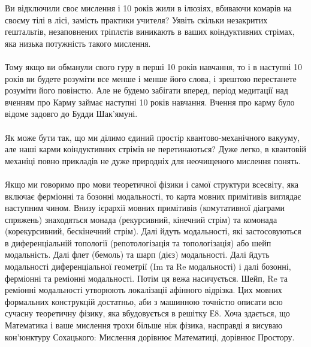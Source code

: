 \newpage
Ви відключили своє мислення і 10 років жили в ілюзіях, вбиваючи комарів на своєму тілі в лісі, замість практики учителя?
Уявіть скільки незакритих гештальтів, незаповнених тріплєтів виникають в ваших коіндуктивних стрімах, яка низька потужність такого мислення.
\\
\\
Тому якщо ви обманули свого гуру в перші 10 років навчання, то і в наступні 10 років ви будете розуміти все менше і менше його слова,
і зрештою перестанете розуміти його повінстю. Але не будемо забігати вперед, період медитації над вченням про Карму займає наступні 10
років навчання. Вчення про карму було відоме задовго до Будди Шак'ямуні.
\\
\\
Як може бути так, що ми ділимо єдиний простір квантово-механічного вакууму, але наші карми коіндуктивних стрімів не перетинаються?
Дуже легко, в квантовій механіці повно прикладів не дуже природніх для неочищеного мислення понять.
\\
\\
Якщо ми говоримо про мови теоретичної фізики і самої структури всесвіту, яка включає ферміонні та бозонні модальності, то карта мовних
примітивів виглядає наступним чином. Внизу ієрархії мовних примітивів (комутативної діаграми спряжень) знаходяться
монада (рекурсивний, кінечний стрім) та комонада (корекурсивний, бескінечний стрім). Далі йдуть модальності, які застосовуються
в диференціальній топології (репотологізація та топологізація) або шейп модальність. Далі флет (бемоль) та шарп (дієз) модальності.
Далі йдуть модальності диференціальної геометрії (Im та Re модальності) і далі бозонні, ферміонні та реміонні модальності. Потім ця вежа
насичується. Шейп, Re та реміонні модальності утворюють локалізації афінного відрізка.
Цих мовних формальних конструкцій достатньо, аби з машинною точністю описати всю сучасну теоретичну фізику, яка вбудовується в решітку Е8.
Хоча здається, що Математика і ваше мислення трохи більше ніж фізика, насправді я висуваю кон'юнктуру
Сохацького: Мислення дорівнює Математиці, дорівнює Простору.

